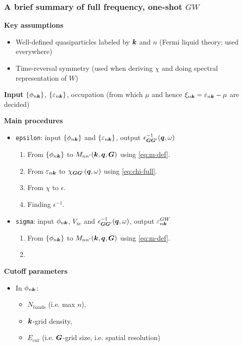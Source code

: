 \documentclass[t]{beamer}
\newcommand{\shortcode}[1]{\texttt{#1}}
\begin{document}
\begin{frame}[allowframebreaks]
\frametitle{A brief summary of full frequency, one-shot $GW$}

\textbf{Key assumptions} \begin{itemize}
    \item Well-defined quasiparticles labeled by $\vb*{k}$ and $n$
    (Fermi liquid theory; used everywhere)
    \item Time-reversal symmetry (used when deriving $\chi$ and doing spectral representation of $W$)
\end{itemize}

\textbf{Input} $\{\phi_{n \vb*{k}}\}$, $\{\varepsilon_{n \vb*{k}}\}$, 
occupation (from which $\mu$ and hence $\xi_{n \vb*{k}} = \varepsilon_{n \vb*{k}} - \mu$
are decided)

\textbf{Main procedures} \begin{itemize}
    \item \shortcode{epsilon}: input $\{\phi_{n \vb*{k}}\}$ and $\{\varepsilon_{n \vb*{k}}\}$, 
    output $\epsilon^{-1}_{\vb*{G} \vb*{G}'}(\vb*{q}, \omega)$
    \begin{enumerate}
        \item From $\{\phi_{n \vb*{k}}\}$ 
        to $M_{n n'}(\vb*{k}, \vb*{q}, \vb*{G})$ using \eqref{eq:m-def}.
        \item From $\varepsilon_{n \vb*{k}}$ to $\chi_{\vb*{G} \vb*{G}'}(\vb*{q}, \omega)$ using \eqref{eq:chi-full}.
        \item From $\chi$ to $\epsilon$.
        \item Finding $\epsilon^{-1}$.
    \end{enumerate}

    \item \shortcode{sigma}: input $\phi_{n \vb*{k}}$, $V_{\text{xc}}$ and $\epsilon^{-1}_{\vb*{G} \vb*{G}'}(\vb*{q}, \omega)$,
    output $\varepsilon_{n \vb*{k}}^{GW}$ 
    \begin{enumerate}
        \item From $\{\phi_{n \vb*{k}}\}$ 
        to $M_{n n'}(\vb*{k}, \vb*{q}, \vb*{G})$ using \eqref{eq:m-def}.
        \item 
    \end{enumerate}
\end{itemize}

\textbf{Cutoff parameters} \begin{itemize}
    \item In $\phi_{n \vb*{k}}$: 
    \begin{itemize}
        \item $N_{\text{bands}}$ (i.e. max $n$), 
        \item $\vb*{k}$-grid density, 
        \item $E_{\text{cut}}$ (i.e. $\vb*{G}$-grid size, i.e. spatial resolution)
    \end{itemize}


\end{itemize}
\end{frame}
\end{document}
